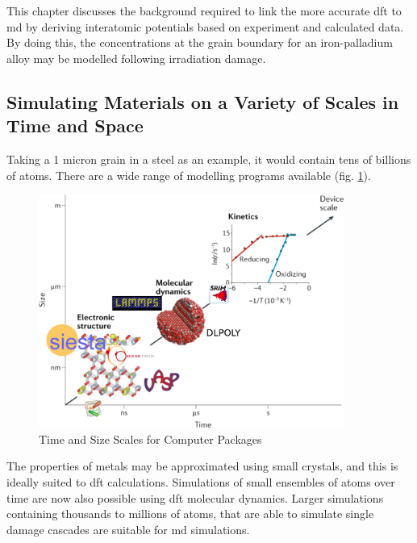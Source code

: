 This chapter discusses the background required to link the more accurate \acrshort{dft} to \acrshort{md} by deriving  interatomic potentials based on experiment and calculated data.  By doing this, the concentrations at the grain boundary for an iron-palladium alloy may be modelled following irradiation damage.



\FloatBarrier
\subsection{Simulating Materials on a Variety of Scales in Time and Space}

Taking a 1 micron grain in a steel as an example, it would contain tens of billions of atoms.  There are a wide range of modelling programs available (fig. \ref{fig:timesizascalesmodelling}). 

\begin{figure}[htbp]
  \begin{center}
    \includegraphics[width=10.0cm]{chapters/interatomic_potential_fitting/images/scale.png}
    \caption{Time and Size Scales for Computer Packages \cite{scalediagram}}
    \label{fig:timesizascalesmodelling}
  \end{center}
\end{figure}

The properties of metals may be approximated using small crystals, and this is ideally suited to \acrshort{dft} calculations.  Simulations of small ensembles of atoms over time are now also possible using \acrshort{dft} molecular dynamics.  Larger simulations containing thousands to millions of atoms, that are able to simulate single damage cascades are suitable for \acrshort{md} simulations.  




